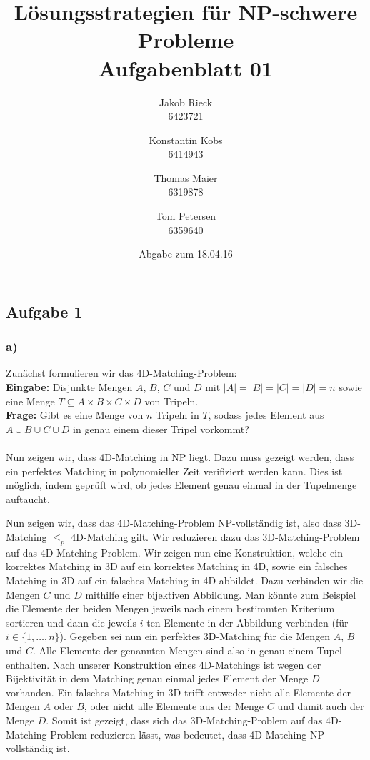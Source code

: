 \documentclass[12pt,a4paper]{article}
\title{Lösungsstrategien für NP-schwere Probleme\\Aufgabenblatt 01}
\author{
		Jakob Rieck\\
		\small{6423721}
	\and
		Konstantin Kobs\\
		\small{6414943}
	\and
		Thomas Maier\\
		\small{6319878}
	\and
		Tom Petersen\\
		\small{6359640}
}
\date{Abgabe zum 18.04.16}
\begin{document}
\maketitle

\subsection*{Aufgabe 1}

\subsubsection*{a)}
Zunächst formulieren wir das 4D-Matching-Problem:\\
\textbf{Eingabe:} Disjunkte Mengen $A$, $B$, $C$ und $D$ mit $|A| = |B| = |C| = |D| = n$ sowie eine Menge $T \subseteq A \times B \times C \times D$ von Tripeln.\\
\textbf{Frage:} Gibt es eine Menge von $n$ Tripeln in $T$, sodass jedes Element aus $A \cup B \cup C \cup D$ in genau einem dieser Tripel vorkommt?
\\\\
Nun zeigen wir, dass 4D-Matching in NP liegt. Dazu muss gezeigt werden, dass ein perfektes Matching in polynomieller Zeit verifiziert werden kann. Dies ist möglich, indem geprüft wird, ob jedes Element genau einmal in der Tupelmenge auftaucht.

Nun zeigen wir, dass das 4D-Matching-Problem NP-vollständig ist, also dass 3D-Matching $\leq_p$ 4D-Matching gilt. Wir reduzieren dazu das 3D-Matching-Problem auf das 4D-Matching-Problem. Wir zeigen nun eine Konstruktion, welche ein korrektes Matching in 3D auf ein korrektes Matching in 4D, sowie ein falsches Matching in 3D auf ein falsches Matching in 4D abbildet. Dazu verbinden wir die Mengen $C$ und $D$ mithilfe einer bijektiven Abbildung. Man könnte zum Beispiel die Elemente der beiden Mengen jeweils nach einem bestimmten Kriterium sortieren und dann die jeweils $i$-ten Elemente in der Abbildung verbinden (für $i \in \{1,\dots,n\}$). Gegeben sei nun ein perfektes 3D-Matching für die Mengen $A$, $B$ und $C$. Alle Elemente der genannten Mengen sind also in genau einem Tupel enthalten. Nach unserer Konstruktion eines 4D-Matchings ist wegen der Bijektivität in dem Matching genau einmal jedes Element der Menge $D$ vorhanden. Ein falsches Matching in 3D trifft entweder nicht alle Elemente der Mengen $A$ oder $B$, oder nicht alle Elemente aus der Menge $C$ und damit auch der Menge $D$. Somit ist gezeigt, dass sich das 3D-Matching-Problem auf das 4D-Matching-Problem reduzieren lässt, was bedeutet, dass 4D-Matching NP-vollständig ist.
\end{document}
